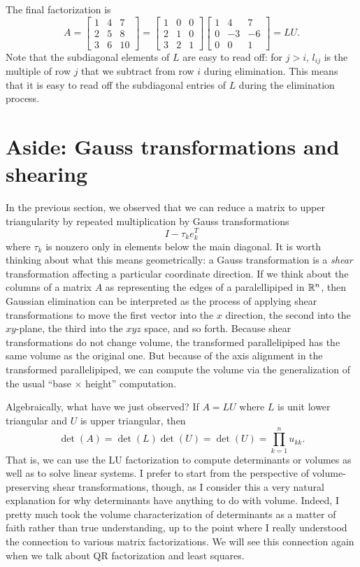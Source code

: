\documentclass[12pt, leqno]{article} %
\begin{document}
The final factorization is
\[
A =
\begin{bmatrix} 1 & 4 & 7 \\ 2 & 5 & 8 \\ 3 & 6 & 10 \end{bmatrix} =
\begin{bmatrix} 1 & 0 & 0 \\ 2 & 1 & 0 \\ 3 & 2 & 1 \end{bmatrix}
\begin{bmatrix} 1 & 4 & 7 \\ 0 & -3 & -6 \\ 0 & 0 & 1 \end{bmatrix} = LU.
\]
Note that the subdiagonal elements of $L$ are easy to read off: for $j
> i$, $l_{ij}$ is the multiple of row $j$ that we subtract from row
$i$ during elimination.  This means that it is easy to read off the
subdiagonal entries of $L$ during the elimination process.

\section{Aside: Gauss transformations and shearing}

In the previous section, we observed that we can reduce a matrix
to upper triangularity by repeated multiplication by Gauss
transformations
\[
  I-\tau_k e_k^T
\]
where $\tau_k$ is nonzero only in elements below the main diagonal.
It is worth thinking about what this means geometrically: a Gauss
transformation is a {\em shear} transformation affecting a particular
coordinate direction.  If we think about the columns of a matrix $A$
as representing the edges of a paralellipiped in $\mathbb{R}^n$, then
Gaussian elimination can be interpreted as the process of applying
shear transformations to move the first vector into the $x$ direction,
the second into the $xy$-plane, the third into the $xyz$ space, and
so forth.  Because shear transformations do not change volume, the
transformed parallelipiped has the same volume as the original one.
But because of the axis alignment in the transformed parallelipiped,
we can compute the volume via the generalization of the
usual ``base $\times$ height'' computation.

Algebraically, what have we just observed?  If $A = LU$ where $L$
is unit lower triangular and $U$ is upper triangular, then
\[
  \det(A) = \det(L) \det(U) = \det(U) = \prod_{k=1}^n u_{kk}.
\]
That is, we can use the LU factorization to compute determinants
or volumes as well as to solve linear systems.  I prefer to start
from the perspective of volume-preserving shear transformations,
though, as I consider this a very natural explanation for why
determinants have anything to do with volume.  Indeed, I pretty much
took the volume characterization of determinants as a matter of faith
rather than true understanding, up to the point where I really
understood the connection to various matrix factorizations.  We will
see this connection again when we talk about QR factorization and
least squares.
\end{document}
